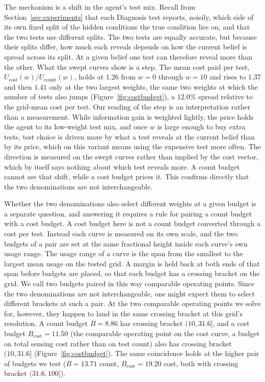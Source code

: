 The mechanism is a shift in the agent's test mix. Recall from Section~\ref{sec:experiments} that each Diagnosis test reports, noisily, which side of its own fixed split of the hidden conditions the true condition lies on, and that the two tests use different splits. The two tests are equally accurate, but because their splits differ, how much each reveals depends on how the current belief is spread across its split. At a given belief one test can therefore reveal more than the other. What the swept curves show is a step. The mean cost paid per test, $U_{\mathrm{cost}}(w)/U_{\mathrm{count}}(w)$, holds at $1.26$ from $w{=}0$ through $w{=}10$ and rises to $1.37$ and then $1.41$ only at the two largest weights, the same two weights at which the number of tests also jumps (Figure~\ref{fig:costbudget}), a $12.0\%$ spread relative to the grid-mean cost per test. Our reading of the step is an interpretation rather than a measurement. While information gain is weighted lightly, the price holds the agent to its low-weight test mix, and once $w$ is large enough to buy extra tests, test choice is driven more by what a test reveals at the current belief than by its price, which on this variant means using the expensive test more often. The direction is measured on the swept curves rather than implied by the cost vector, which by itself says nothing about which test reveals more. A count budget cannot see that shift, while a cost budget prices it. This confirms directly that the two denominations are not interchangeable.

Whether the two denominations also select different weights at a given budget is a separate question, and answering it requires a rule for pairing a count budget with a cost budget. A cost budget here is not a count budget converted through a cost per test. Instead each curve is measured on its own scale, and the two budgets of a pair are set at the same fractional height inside each curve's own usage range. The usage range of a curve is the span from the smallest to the largest mean usage on the tested grid. A margin is held back at both ends of that span before budgets are placed, so that each budget has a crossing bracket on the grid. We call two budgets paired in this way comparable operating points. Since the two denominations are not interchangeable, one might expect them to select different brackets at such a pair. At the two comparable operating points we solve for, however, they happen to land in the same crossing bracket at this grid's resolution. A count budget $B{=}8.86$ has crossing bracket $(10, 31.6]$, and a cost budget $B_{\mathrm{cost}}{=}11.50$ (the comparable operating point on the cost curve, a budget on total sensing cost rather than on test count) also has crossing bracket $(10, 31.6]$ (Figure~\ref{fig:costbudget}). The same coincidence holds at the higher pair of budgets we test ($B{=}13.71$ count, $B_{\mathrm{cost}}{=}19.20$ cost, both with crossing bracket $(31.6, 100]$).

